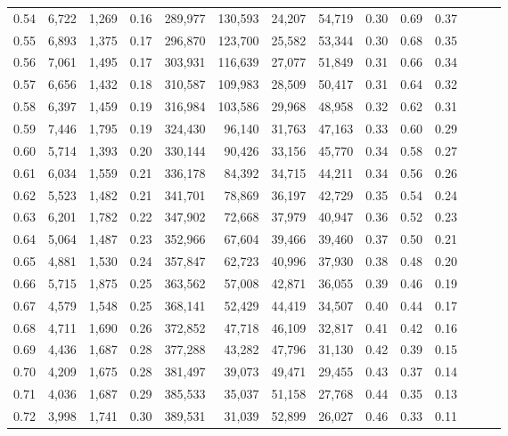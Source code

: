 \begin{tabular}{rrrrrrrrrrrrrr}
0.54 &  6,722 &  1,269 &  0.16 &  289,977 &  130,593 &  24,207 &  54,719 &  0.30 &  0.69 &      0.37 \\
0.55 &  6,893 &  1,375 &  0.17 &  296,870 &  123,700 &  25,582 &  53,344 &  0.30 &  0.68 &      0.35 \\
0.56 &  7,061 &  1,495 &  0.17 &  303,931 &  116,639 &  27,077 &  51,849 &  0.31 &  0.66 &      0.34 \\
0.57 &  6,656 &  1,432 &  0.18 &  310,587 &  109,983 &  28,509 &  50,417 &  0.31 &  0.64 &      0.32 \\
0.58 &  6,397 &  1,459 &  0.19 &  316,984 &  103,586 &  29,968 &  48,958 &  0.32 &  0.62 &      0.31 \\
0.59 &  7,446 &  1,795 &  0.19 &  324,430 &   96,140 &  31,763 &  47,163 &  0.33 &  0.60 &      0.29 \\
0.60 &  5,714 &  1,393 &  0.20 &  330,144 &   90,426 &  33,156 &  45,770 &  0.34 &  0.58 &      0.27 \\
0.61 &  6,034 &  1,559 &  0.21 &  336,178 &   84,392 &  34,715 &  44,211 &  0.34 &  0.56 &      0.26 \\
0.62 &  5,523 &  1,482 &  0.21 &  341,701 &   78,869 &  36,197 &  42,729 &  0.35 &  0.54 &      0.24 \\
0.63 &  6,201 &  1,782 &  0.22 &  347,902 &   72,668 &  37,979 &  40,947 &  0.36 &  0.52 &      0.23 \\
0.64 &  5,064 &  1,487 &  0.23 &  352,966 &   67,604 &  39,466 &  39,460 &  0.37 &  0.50 &      0.21 \\
0.65 &  4,881 &  1,530 &  0.24 &  357,847 &   62,723 &  40,996 &  37,930 &  0.38 &  0.48 &      0.20 \\
0.66 &  5,715 &  1,875 &  0.25 &  363,562 &   57,008 &  42,871 &  36,055 &  0.39 &  0.46 &      0.19 \\
0.67 &  4,579 &  1,548 &  0.25 &  368,141 &   52,429 &  44,419 &  34,507 &  0.40 &  0.44 &      0.17 \\
0.68 &  4,711 &  1,690 &  0.26 &  372,852 &   47,718 &  46,109 &  32,817 &  0.41 &  0.42 &      0.16 \\
0.69 &  4,436 &  1,687 &  0.28 &  377,288 &   43,282 &  47,796 &  31,130 &  0.42 &  0.39 &      0.15 \\
0.70 &  4,209 &  1,675 &  0.28 &  381,497 &   39,073 &  49,471 &  29,455 &  0.43 &  0.37 &      0.14 \\
0.71 &  4,036 &  1,687 &  0.29 &  385,533 &   35,037 &  51,158 &  27,768 &  0.44 &  0.35 &      0.13 \\
0.72 &  3,998 &  1,741 &  0.30 &  389,531 &   31,039 &  52,899 &  26,027 &  0.46 &  0.33 &      0.11 \\

\end{tabular}
